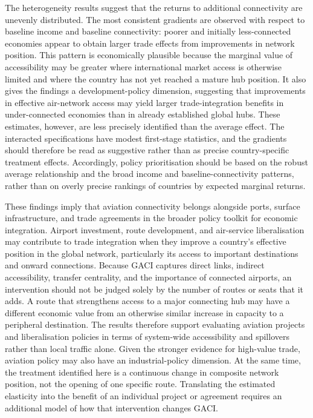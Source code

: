 The heterogeneity results suggest that the returns to additional connectivity
are unevenly distributed. The most consistent gradients are observed with
respect to baseline income and baseline connectivity: poorer and initially
less-connected economies appear to obtain larger trade effects from
improvements in network position. This pattern is economically plausible
because the marginal value of accessibility may be greater where
international market access is otherwise limited and where the country has
not yet reached a mature hub position. It also gives the findings a
development-policy dimension, suggesting that improvements in effective
air-network access may yield larger trade-integration benefits in
under-connected economies than in already established global hubs. These
estimates, however, are less precisely identified than the average effect.
The interacted specifications have modest first-stage statistics, and the
gradients should therefore be read as suggestive rather than as precise
country-specific treatment effects. Accordingly, policy prioritisation should
be based on the robust average relationship and the broad income and
baseline-connectivity patterns, rather than on overly precise rankings of
countries by expected marginal returns.

These findings imply that aviation connectivity belongs alongside ports,
surface infrastructure, and trade agreements in the broader policy toolkit
for economic integration. Airport investment, route development, and
air-service liberalisation may contribute to trade integration when they
improve a country's effective position in the global network, particularly
its access to important destinations and onward connections. Because GACI
captures direct links, indirect accessibility, transfer centrality, and the
importance of connected airports, an intervention should not be judged solely
by the number of routes or seats that it adds. A route that strengthens
access to a major connecting hub may have a different economic value from an
otherwise similar increase in capacity to a peripheral destination. The
results therefore support evaluating aviation projects and liberalisation
policies in terms of system-wide accessibility and spillovers rather than
local traffic alone. Given the stronger evidence for high-value trade,
aviation policy may also have an industrial-policy dimension. At the same
time, the treatment identified here is a continuous change in composite
network position, not the opening of one specific route. Translating the
estimated elasticity into the benefit of an individual project or agreement
requires an additional model of how that intervention changes GACI.

